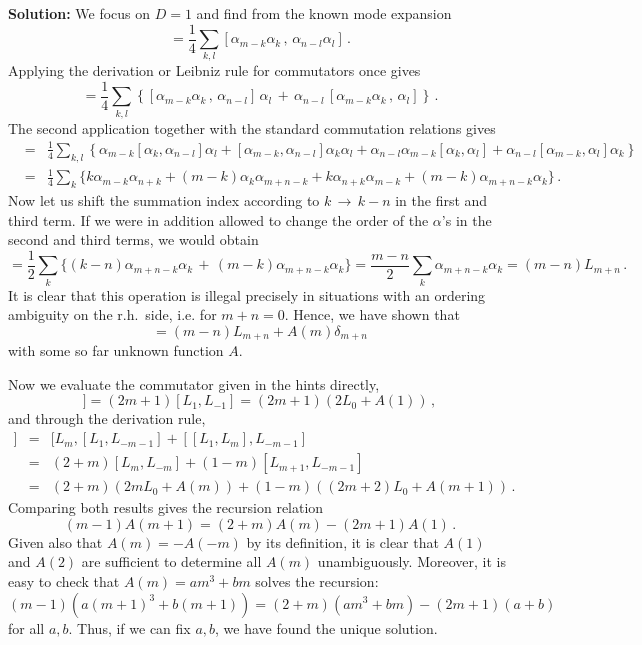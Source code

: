 \documentclass[12pt]{article}
\newcommand{\be}{\begin{equation}}
\newcommand{\ee}{\end{equation}}
\newcommand{\bea}{\begin{eqnarray}}
\newcommand{\eea}{\end{eqnarray}}
\numberwithin{equation}{section}
\begin{document}
\noindent
{\bf Solution:} We focus on $D=1$ and find from the known mode expansion
\be
[L_m,L_n]=\frac{1}{4}\sum_{k,l}[\alpha_{m-k}\alpha_k\,,\,\alpha_{n-l}\alpha_l]\,.
\ee
Applying the derivation or Leibniz rule for commutators once gives
\be
[L_m,L_n]=\frac{1}{4}\sum_{k,l}\left\{
[\alpha_{m-k}\alpha_k\,,\,\alpha_{n-l}]\,\alpha_l\,+\,
\alpha_{n-l}\,[\alpha_{m-k}\alpha_k\,,\,\alpha_l]
\right\}\,.
\ee
The second application together with the standard commutation relations gives
\bea
[L_m,L_n]\!\!\!&=&\!\!\!\frac{1}{4}\sum_{k,l}\left\{
\alpha_{m-k}[\alpha_k,\alpha_{n-l}]\alpha_l
+
[\alpha_{m-k},\alpha_{n-l}]\alpha_k \alpha_l
+
\alpha_{n-l}\alpha_{m-k}[\alpha_k,\alpha_l]
+
\alpha_{n-l}[\alpha_{m-k},\alpha_l]\alpha_k
\right\}
\nonumber \\
&=&\!\!\frac{1}{4}\sum_k\{
k\alpha_{m-k}\alpha_{n+k}+(m-k)\alpha_k\alpha_{m+n-k}+k\alpha_{n+k}\alpha_{m-k}
+(m-k)\alpha_{m+n-k}\alpha_k
\}\,.
\eea
Now let us shift the summation index according to $k\,\to\,k-n$ in the first and third term. If we were in addition allowed to change the order of the $\alpha$'s in the second and third terms, we would obtain
\be
[L_m,L_n]=\frac{1}{2}\sum_k\{
(k-n)\alpha_{m+n-k}\alpha_k\,+\,(m-k)\alpha_{m+n-k}\alpha_k
\}
= \frac{m-n}{2} \sum_k\alpha_{m+n-k}\alpha_k = (m-n)L_{m+n}\,.
\ee
It is clear that this operation is illegal precisely in situations with an ordering ambiguity on the r.h.~side, i.e. for $m+n=0$. Hence, we have shown that
\be
[L_m,L_n]=(m-n)L_{m+n}+A(m)\delta_{m+n}
\ee
with some so far unknown function $A$. 

Now we evaluate the commutator given in the hints directly,
\be
[L_1,[L_m,L_{-m-1}]]=(2m+1)[L_1,L_{-1}]=(2m+1)(2L_0+A(1))\,,
\ee
and through the derivation rule,
\bea
[L_1,[L_m,L_{-m-1}]]&=&[L_m,[L_1,L_{-m-1}]+[[L_1,L_m],L_{-m-1}]
\nonumber \\
&=& (2+m)[L_m,L_{-m}]+(1-m)[L_{m+1},L_{-m-1}]
\nonumber \\
&=& (2+m)(2mL_0+A(m))+(1-m)((2m+2)L_0+A(m+1))\,.
\eea
Comparing both results gives the recursion relation
\be
(m-1)A(m+1)=(2+m)A(m)-(2m+1)A(1)\,.
\ee
Given also that $A(m)=-A(-m)$ by its definition, it is clear that $A(1)$ and $A(2)$ are sufficient to determine all $A(m)$ unambiguously. Moreover, it is easy to check that $A(m)=am^3+bm$ solves the recursion:
\be
(m-1)(a(m+1)^3+b(m+1))=(2+m)(am^3+bm)-(2m+1)(a+b)
\ee
for all $a,b$. Thus, if we can fix $a,b$, we have found the unique solution.
\end{document}

